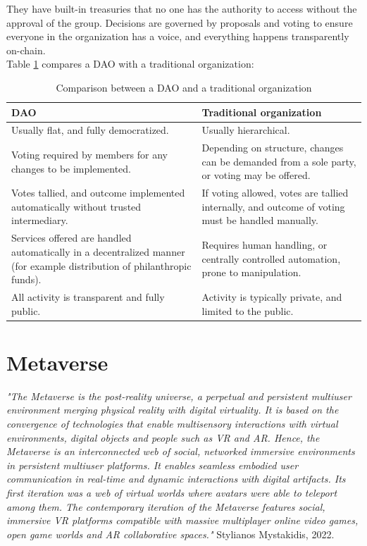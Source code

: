 \documentclass[MSE,Master,english]{twbook}%
\begin{document}
They have built-in treasuries that no one has the authority to access without the approval of the group. Decisions are governed by proposals and voting to ensure everyone in the organization has a voice, and everything happens transparently on-chain.\cite{DAO} \\

Table \ref{table:DAOComparison} compares a DAO with a traditional organization:
\begin{center}
  \begin{table}[H]
    \begin{tabular}{ | m{20em} | m{20em} | }
      \hline
      \textbf{DAO} & \textbf{Traditional organization} \\ 
      \hline
      Usually flat, and fully democratized. & Usually hierarchical. \\
      \hline  
      Voting required by members for any changes to be implemented. & Depending on structure, changes can be demanded from a sole party, or voting may be offered. \\
      \hline
      Votes tallied, and outcome implemented automatically without trusted intermediary. & If voting allowed, votes are tallied internally, and outcome of voting must be handled manually. \\
      \hline
      Services offered are handled automatically in a decentralized manner (for example distribution of philanthropic funds). & Requires human handling, or centrally controlled automation, prone to manipulation. \\
      \hline
      All activity is transparent and fully public. & Activity is typically private, and limited to the public. \\
      \hline
    \end{tabular}
    \caption{Comparison between a DAO and a traditional organization \cite{DAO}}
    \label{table:DAOComparison}
  \end{table}
\end{center}

\section{Metaverse}
\emph{"The Metaverse is the post-reality universe, a perpetual and persistent multiuser environment merging physical reality with digital virtuality. It is based on the convergence of technologies that enable multisensory interactions with virtual environments, digital objects and people such as \ac{VR} and \ac{AR}. Hence, the Metaverse is an interconnected web of social, networked immersive environments in persistent multiuser platforms. It enables seamless embodied user communication in real-time and dynamic interactions with digital artifacts. Its first iteration was a web of virtual worlds where avatars were able to teleport among them. The contemporary iteration of the Metaverse features social, immersive VR platforms compatible with massive multiplayer online video games, open game worlds and AR collaborative spaces."} Stylianos Mystakidis, 2022. \cite{metaverse} \\
\end{document}
